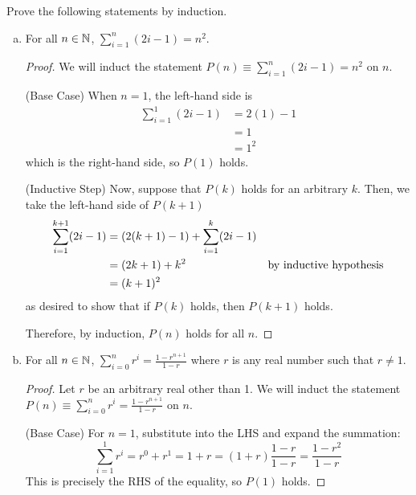 \question Prove the following statements by induction.
\begin{enumerate}[(a)]
  \item For all $n\in\mathbb{N}$, $\displaystyle \sum^n_{i=1} (2i-1) = n^2$.
        \begin{proof}
          We will induct the statement $P(n) \equiv \sum^n_{i=1} (2i-1) = n^2$ on $n$.

          (Base Case) When $n = 1$, the left-hand side is
          \begin{align*}
            \sum^1_{i=1} (2i-1) & = 2(1)-1 \\
                                & = 1      \\
                                & = 1^2
          \end{align*}
          which is the right-hand side, so $P(1)$ holds.

          (Inductive Step) Now, suppose that $P(k)$ holds for an arbitrary $k$.
          Then, we take the left-hand side of $P(k+1)$
          \begin{align*}
            \sum^{k+1}_{i=1} (2i-1)
             & = (2(k+1)-1) + \sum^k_{i=1} (2i-1) \\
             & = (2k+1) + k^2 & \text{by inductive hypothesis}                 \\
             & = (k+1)^2
          \end{align*}
          as desired to show that if $P(k)$ holds, then $P(k+1)$ holds.

          Therefore, by induction, $P(n)$ holds for all $n$.
        \end{proof}
  \item For all $n\in\mathbb{N}$, $\displaystyle \sum^n_{i=0} r^i = \frac{1-r^{n+1}}{1-r}$ where $r$ is any real number such that $r \neq 1$.
        \begin{proof}
          Let $r$ be an arbitrary real other than 1.
          We will induct the statement $P(n) \equiv \sum^n_{i=0} r^i = \frac{1-r^{n+1}}{1-r}$ on $n$.

          (Base Case) For $n=1$, substitute into the LHS and expand the summation:
          \begin{equation*}
            \sum^1_{i=1} r^i = r^0 + r^1 = 1 + r = (1+r)\frac{1-r}{1-r} = \frac{1-r^2}{1-r}
          \end{equation*}
          This is precisely the RHS of the equality, so $P(1)$ holds.


\end{proof}
\end{enumerate}
